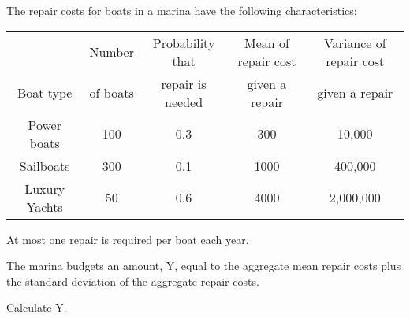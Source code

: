 The repair costs for boats in a marina have the following characteristics:
\begin{center}\begin{tabular}{|c|c|c|c|c|} \hline 
              & Number   & Probability that & Mean of repair cost & Variance of repair cost \\
Boat type     & of boats & repair is needed & given a repair      & given a repair \\ \hline
Power boats   & 100      & 0.3              & 300                 & 10,000 \\ 
Sailboats     & 300      & 0.1              & 1000                & 400,000 \\
Luxury Yachts & 50       & 0.6              & 4000                & 2,000,000 \\ \hline
\end{tabular}\end{center}
At most one repair is required per boat each year.

The marina budgets an amount, Y, equal to the aggregate mean repair costs plus the standard
deviation of the aggregate repair costs.

Calculate Y.
